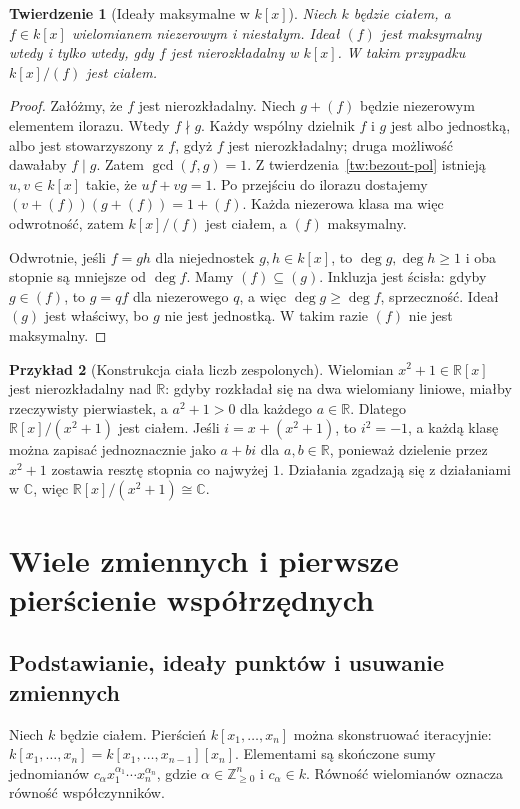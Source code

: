 \documentclass[11pt,a4paper,openany]{report}
\numberwithin{equation}{section}
\theoremstyle{plain}
\newtheorem{twierdzenie}{Twierdzenie}[section]
\theoremstyle{definition}
\newtheorem{przyklad}[twierdzenie]{Przykład}
\theoremstyle{remark}
\newcommand{\Z}{\mathbb Z}
\newcommand{\R}{\mathbb R}
\newcommand{\C}{\mathbb C}
\begin{document}
\begin{twierdzenie}[Ideały maksymalne w {$k[x]$}]
\label{tw:irreducible}
Niech $k$ będzie ciałem, a $f\in k[x]$ wielomianem niezerowym
i niestałym. Ideał $(f)$ jest maksymalny wtedy i tylko wtedy,
gdy $f$ jest nierozkładalny w $k[x]$. W takim przypadku
$k[x]/(f)$ jest ciałem.
\end{twierdzenie}
\begin{proof}
Załóżmy, że $f$ jest nierozkładalny.
Niech $g+(f)$ będzie niezerowym elementem ilorazu.
Wtedy $f\nmid g$. Każdy wspólny dzielnik $f$ i $g$
jest albo jednostką, albo jest stowarzyszony z $f$,
gdyż $f$ jest nierozkładalny; druga możliwość dawałaby $f\mid g$.
Zatem $\gcd(f,g)=1$. Z twierdzenia~\ref{tw:bezout-pol}
istnieją $u,v\in k[x]$ takie, że $uf+vg=1$.
Po przejściu do ilorazu dostajemy
$(v+(f))(g+(f))=1+(f)$. Każda niezerowa klasa ma więc odwrotność,
zatem $k[x]/(f)$ jest ciałem, a $(f)$ maksymalny.

Odwrotnie, jeśli $f=gh$ dla niejednostek $g,h\in k[x]$,
to $\deg g,\deg h\ge1$ i oba stopnie są mniejsze od $\deg f$.
Mamy $(f)\subseteq(g)$. Inkluzja jest ścisła:
gdyby $g\in(f)$, to $g=qf$ dla niezerowego $q$,
a więc $\deg g\ge\deg f$, sprzeczność.
Ideał $(g)$ jest właściwy, bo $g$ nie jest jednostką.
W takim razie $(f)$ nie jest maksymalny.
\end{proof}

\begin{przyklad}[Konstrukcja ciała liczb zespolonych]
Wielomian $x^2+1\in\R[x]$ jest nierozkładalny nad $\R$:
gdyby rozkładał się na dwa wielomiany liniowe,
miałby rzeczywisty pierwiastek, a $a^2+1>0$ dla każdego $a\in\R$.
Dlatego $\R[x]/(x^2+1)$ jest ciałem.
Jeśli $i=x+(x^2+1)$, to $i^2=-1$, a każdą klasę można zapisać
jednoznacznie jako $a+bi$ dla $a,b\in\R$,
ponieważ dzielenie przez $x^2+1$ zostawia resztę stopnia co najwyżej $1$.
Działania zgadzają się z działaniami w $\C$,
więc $\R[x]/(x^2+1)\cong\C$.
\end{przyklad}

\section{Wiele zmiennych i pierwsze pierścienie współrzędnych}

\subsection{Podstawianie, ideały punktów i usuwanie zmiennych}

Niech $k$ będzie ciałem. Pierścień $k[x_1,\dots,x_n]$
można skonstruować iteracyjnie:
$k[x_1,\dots,x_n]=k[x_1,\dots,x_{n-1}][x_n]$.
Elementami są skończone sumy jednomianów
$c_{\alpha}x_1^{\alpha_1}\cdots x_n^{\alpha_n}$,
gdzie $\alpha\in\Z_{\ge0}^n$ i $c_\alpha\in k$.
Równość wielomianów oznacza równość współczynników.
\end{document}
